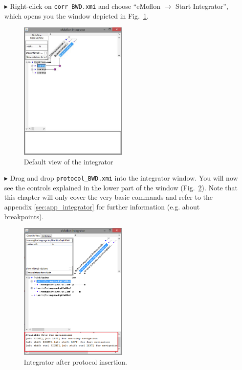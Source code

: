 \begin{enumerate}


\item[$\blacktriangleright$] Right-click on \texttt{corr\_BWD.xmi} and choose ``eMoflon $\rightarrow$ Start Integrator'', which opens you the window depicted in Fig.~\ref{fig:integrator_start}.

\begin{figure}[htbp]
\begin{center}
  \includegraphics[width=0.5\textwidth]{pics/tggBilder/transformation/integrator_start_view}
  \caption{Default view of the integrator}
  \label{fig:integrator_start}
\end{center}
\end{figure}

\item[$\blacktriangleright$] Drag and drop \texttt{protocol\_BWD.xmi} into the integrator window. You will now see the controls explained in the lower part of the window (Fig.~\ref{fig:integrator_after_protocol}). Note that this chapter will only cover the very basic commands and refer to the appendix \ref{sec:app_integrator} for further information (e.g. about breakpoints).

\begin{figure}[htbp]
\begin{center}
  \includegraphics[width=0.5\textwidth]{pics/tggBilder/transformation/integrator_after_protocol_insertion.png}
  \caption{Integrator after protocol insertion.}
  \label{fig:integrator_after_protocol}
\end{center}
\end{figure}
\FloatBarrier


\end{enumerate}
